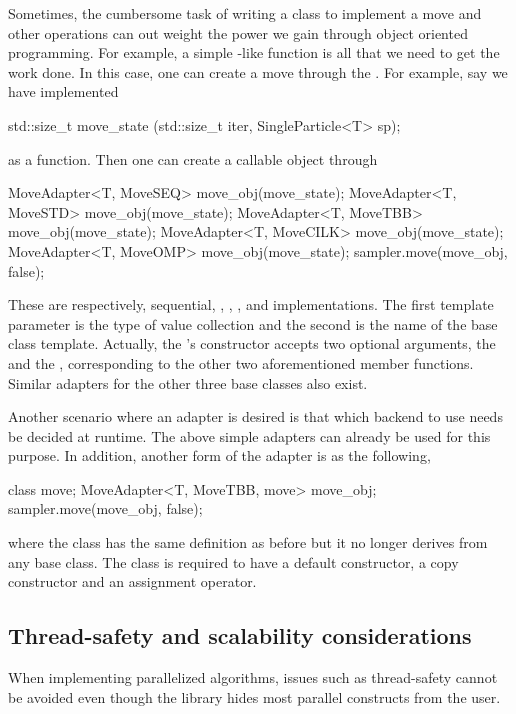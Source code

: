 Sometimes, the cumbersome task of writing a class to implement a move and
other operations can out weight the power we gain through object oriented
programming. For example, a simple -like function is all
that we need to get the work done. In this case, one can create a move through
the . For example, say we have implemented
\begin{cppcode}
std::size_t move_state (std::size_t iter, SingleParticle<T> sp);
\end{cppcode}
as a function. Then one can create a callable object through
\begin{cppcode}
MoveAdapter<T, MoveSEQ>  move_obj(move_state);
MoveAdapter<T, MoveSTD>  move_obj(move_state);
MoveAdapter<T, MoveTBB>  move_obj(move_state);
MoveAdapter<T, MoveCILK> move_obj(move_state);
MoveAdapter<T, MoveOMP>  move_obj(move_state);
sampler.move(move_obj, false);
\end{cppcode}
These are respectively, sequential, \cppoo{} , \tbb,
\cilk, and \openmp implementations. The first template parameter is the type
of value collection and the second is the name of the base class template.
Actually, the 's constructor accepts two optional
arguments, the  and the ,
corresponding to the other two aforementioned member functions. Similar
adapters for the other three base classes also exist.

Another scenario where an adapter is desired is that which backend to use
needs be decided at runtime. The above simple adapters can already be used for
this purpose. In addition, another form of the adapter is as the following,
\begin{cppcode}
class move;
MoveAdapter<T, MoveTBB, move> move_obj;
sampler.move(move_obj, false);
\end{cppcode}
where the class  has the same definition as before but it no
longer derives from any base class. The class  is required to
have a default constructor, a copy constructor and an assignment operator.

\subsection{Thread-safety and scalability considerations}
\label{sub:Thread-safety and scalability considerations}

When implementing parallelized \smc algorithms, issues such as thread-safety
cannot be avoided even though the \vsmc library hides most parallel constructs
from the user.

